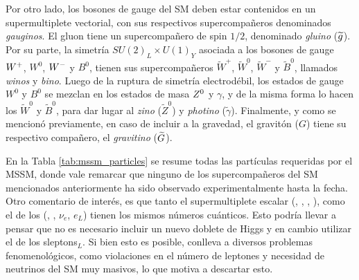Por otro lado, los bosones de gauge del SM deben estar contenidos en un supermultiplete vectorial, con sus respectivos supercompañeros denominados \textit{gauginos}. El gluon tiene un supercompañero de spin $1/2$, denominado \textit{gluino} ($\widetilde{g}$). Por su parte, la simetría $SU(2)_L\times U(1)_Y$ asociada a los bosones de gauge $W^{+}$, $W^0$, $W^{-}$ y $B^0$, tienen sus supercompañeros $\widetilde{W}^+$, $\widetilde{W}^0$, $\widetilde{W}^-$ y $\tilde{B}^0$, llamados \textit{winos} y \textit{bino}. Luego de la ruptura de simetría electrodébil, los estados de gauge $W^0$ y $B^0$ se mezclan en los estados de masa $Z^0$ y $\gamma$, y de la misma forma lo hacen los $\widetilde{W}^0$ y $\widetilde{B}^0$, para dar lugar al \textit{zino} ($\widetilde{Z}^0$) y \textit{photino} ($\tilde{\gamma}$). Finalmente, y como se mencionó previamente, en caso de incluir a la gravedad, el gravitón ($G$) tiene su respectivo compañero, el \textit{gravitino} ($\widetilde{G}$).

En la Tabla \ref{tab:mssm_particles} se resume todas las partículas requeridas por el MSSM, donde vale remarcar que ninguno de los supercompañeros del SM mencionados anteriormente ha sido observado experimentalmente hasta la fecha. Otro comentario de interés, es que tanto el supermultiplete escalar \Hd (\Hdzero, \Hdm, \Hinodzero, \Hinodm), como el de los \sleptonL (\snu, \selL, $\nu_e$, $e_L$) tienen los mismos números cuánticos. Esto podría llevar a pensar que no es necesario incluir un nuevo doblete de Higgs y en cambio utilizar el de los sleptons$_L$. Si bien esto es posible, conlleva a diversos problemas fenomenológicos, como violaciones en el número de leptones y necesidad de neutrinos del SM muy masivos, lo que motiva a descartar esto.


